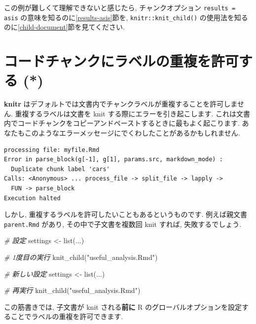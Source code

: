 \documentclass[
  11pt,
  lualatex,ja=standard,jafont=noto]{bxjsreport}
\newenvironment{Shaded}{\begin{snugshade}}{\end{snugshade}}
\newcommand{\CommentTok}[1]{\textcolor[rgb]{0.56,0.35,0.01}{\textit{#1}}}
\newcommand{\FunctionTok}[1]{\textcolor[rgb]{0.00,0.00,0.00}{#1}}
\newcommand{\NormalTok}[1]{#1}
\newcommand{\OtherTok}[1]{\textcolor[rgb]{0.56,0.35,0.01}{#1}}
\newcommand{\StringTok}[1]{\textcolor[rgb]{0.31,0.60,0.02}{#1}}
\begin{document}
この例が難しくて理解できないと感じたら, チャンクオプション \texttt{results = \textquotesingle{}asis\textquotesingle{}} の意味を知るのに\ref{results-asis}節を, \texttt{knitr::knit\_child()} の使用法を知るのに\ref{child-document}節を見てください.

\hypertarget{duplicate-label}{%
\section{コードチャンクにラベルの重複を許可する (*)}\label{duplicate-label}}

\textbf{knitr} はデフォルトでは文書内でチャンクラベルが重複することを許可しません. 重複するラベルは文書を knit する際にエラーを引き起こします. これは文書内でコードチャンクをコピーアンドペーストするときに最もよく起こります. あなたもこのようなエラーメッセージにでくわしたことがあるかもしれません.

\begin{verbatim}
processing file: myfile.Rmd
Error in parse_block(g[-1], g[1], params.src, markdown_mode) :
  Duplicate chunk label 'cars'
Calls: <Anonymous> ... process_file -> split_file -> lapply ->
  FUN -> parse_block
Execution halted
\end{verbatim}

しかし, 重複するラベルを許可したいこともあるというものです. 例えば親文書 \texttt{parent.Rmd} があり, その中で子文書を複数回 knit すれば, 失敗するでしょう.

\begin{Shaded}
\begin{Highlighting}[numbers=left,,]
\CommentTok{\# 設定}
\NormalTok{settings }\OtherTok{\textless{}{-}} \FunctionTok{list}\NormalTok{(...)}

\CommentTok{\# 1度目の実行}
\FunctionTok{knit\_child}\NormalTok{(}\StringTok{"useful\_analysis.Rmd"}\NormalTok{)}

\CommentTok{\# 新しい設定}
\NormalTok{settings }\OtherTok{\textless{}{-}} \FunctionTok{list}\NormalTok{(...)}

\CommentTok{\# 再実行}
\FunctionTok{knit\_child}\NormalTok{(}\StringTok{"useful\_analysis.Rmd"}\NormalTok{)}
\end{Highlighting}
\end{Shaded}

この筋書きでは, 子文書が knit される\textbf{前に} R のグローバルオプションを設定することでラベルの重複を許可できます.
\end{document}
